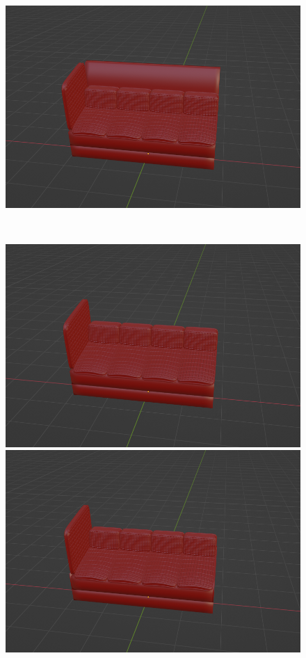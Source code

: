 \begin{figure}[h]
\begin{minipage}[b]{0.48\linewidth}
  \includegraphics[scale=0.17]{./imgs/sofaParamMean/backSideHeightMax.png}
 \end{minipage}\\
 \begin{minipage}[b]{0.48\linewidth}
  \centering
  \includegraphics[scale=0.17]{./imgs/sofaParamMean/sideNumMin.png}
 \end{minipage}
 \begin{minipage}[b]{0.48\linewidth}
  \centering
  \includegraphics[scale=0.17]{./imgs/sofaParamMean/sideNumMax.png}

\end{minipage}
\end{figure}
